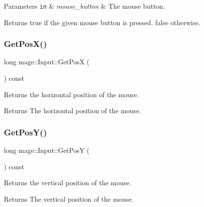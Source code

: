 \begin{DoxyParams}[1]{Parameters}
\mbox{\tt in}  & {\em mouse\+\_\+button} & The mouse button. \\
\hline
\end{DoxyParams}
\begin{DoxyReturn}{Returns}
{\ttfamily true} if the given mouse button is pressed. {\ttfamily false} otherwise. 
\end{DoxyReturn}
\hypertarget{classmage_1_1_input_a5b839b6ead23e1c0ec623fb82c5d6e45}{}\label{classmage_1_1_input_a5b839b6ead23e1c0ec623fb82c5d6e45} 
\subsubsection{\texorpdfstring{Get\+Pos\+X()}{GetPosX()}}
{\footnotesize\ttfamily long mage\+::\+Input\+::\+Get\+PosX (\begin{DoxyParamCaption}{ }\end{DoxyParamCaption}) const}

Returns the horizontal position of the mouse.

\begin{DoxyReturn}{Returns}
The horizontal position of the mouse. 
\end{DoxyReturn}
\hypertarget{classmage_1_1_input_a4c7d46233ccf74d45c28549e5ecdd244}{}\label{classmage_1_1_input_a4c7d46233ccf74d45c28549e5ecdd244} 
\subsubsection{\texorpdfstring{Get\+Pos\+Y()}{GetPosY()}}
{\footnotesize\ttfamily long mage\+::\+Input\+::\+Get\+PosY (\begin{DoxyParamCaption}{ }\end{DoxyParamCaption}) const}

Returns the vertical position of the mouse.

\begin{DoxyReturn}{Returns}
The vertical position of the mouse. 
\end{DoxyReturn}
\hypertarget{classmage_1_1_input_ab152509540c3f41d337296edc2aea660}{}\label{classmage_1_1_input_ab152509540c3f41d337296edc2aea660} 
